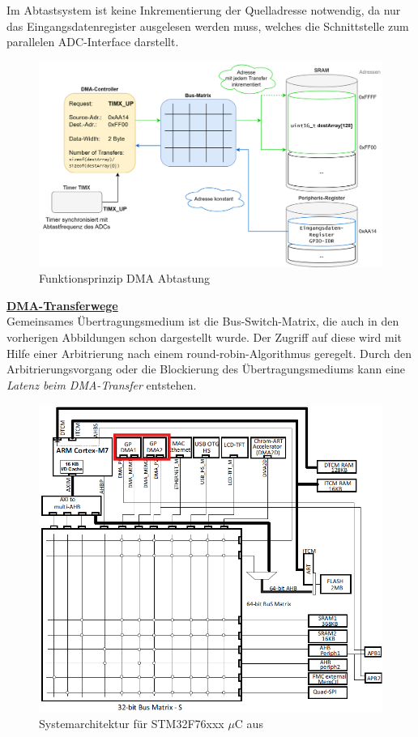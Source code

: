 \documentclass[a4paper, portrait, 12pt]{scrartcl} %
\begin{document}
Im Abtastsystem ist keine Inkrementierung der Quelladresse notwendig, da nur das Eingangsdatenregister ausgelesen werden muss, welches die Schnittstelle zum parallelen ADC-Interface darstellt. 

\begin{figure}[H]
	\centering
    \includegraphics[scale=0.1]{Prinzip_DMA_Datenerfassung.png} 
	\caption{Funktionsprinzip DMA Abtastung}
	\label{fig:periph_to_mem}
\end{figure}

\pagebreak

\textbf{\underline{DMA-Transferwege}}\\

Gemeinsames Übertragungsmedium ist die Bus-Switch-Matrix, die auch in den vorherigen Abbildungen schon dargestellt wurde. Der Zugriff auf diese wird mit Hilfe einer Arbitrierung nach einem round-robin-Algorithmus geregelt. 
Durch den Arbitrierungsvorgang oder die Blockierung des Übertragungsmediums kann eine \emph{Latenz beim DMA-Transfer} entstehen.

\begin{figure}[H]
	\centering
    \includegraphics[scale=0.5]{Systemarchitektur_STM32F7.png} 
	\caption{Systemarchitektur für STM32F76xxx $\mu$C aus \cite[S. 72]{STmicroelectronics2024}}
	\label{fig:sysarch_stm32f7}
\end{figure}
\end{document}
